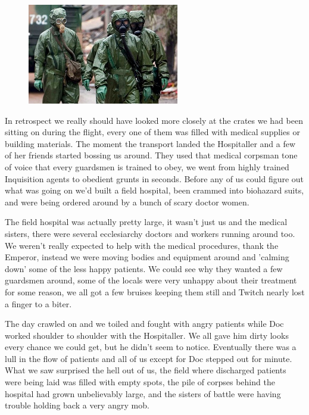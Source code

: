 \begin{figure}
	\begin{center}
		\includegraphics[width=\figwidth]{pics/6/21.png}
	\end{center}
\end{figure}
In retrospect we really should have looked more closely at the crates we had been sitting on during the flight, every one of them was filled with medical supplies or building materials. 
The moment the transport landed the Hospitaller and a few of her friends started bossing us around. 
They used that medical corpsman tone of voice that every guardsmen is trained to obey, we went from highly trained Inquisition agents to obedient grunts in seconds. 
Before any of us could figure out what was going on we'd built a field hospital, been crammed into biohazard suits, and were being ordered around by a bunch of scary doctor women.

The field hospital was actually pretty large, it wasn't just us and the medical sisters, there were several ecclesiarchy doctors and workers running around too. 
We weren't really expected to help with the medical procedures, thank the Emperor, instead we were moving bodies and equipment around and 'calming down' some of the less happy patients. 
We could see why they wanted a few guardsmen around, some of the locals were very unhappy about their treatment for some reason, we all got a few bruises keeping them still and Twitch nearly lost a finger to a biter.

The day crawled on and we toiled and fought with angry patients while Doc worked shoulder to shoulder with the Hospitaller. 
We all gave him dirty looks every chance we could get, but he didn't seem to notice. 
Eventually there was a lull in the flow of patients and all of us except for Doc stepped out for minute. 
What we saw surprised the hell out of us, the field where discharged patients were being laid was filled with empty spots, the pile of corpses behind the hospital had grown unbelievably large, and the sisters of battle were having trouble holding back a very angry mob.

